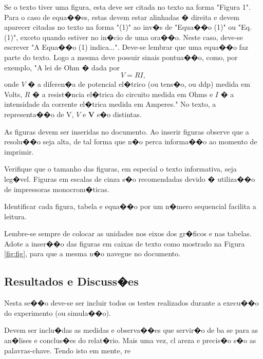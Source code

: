 \documentclass[conference]{IEEEtran}
\begin{document}
Se o texto tiver uma figura, esta deve ser citada no texto na forma "Figura 1". Para o caso de equa��es, estas devem estar alinhadas � direita e devem aparecer citadas no texto na forma "(1)" ao inv�s de "Equa��o (1)" ou "Eq. (1)", exceto quando estiver no in�cio de uma ora��o. Neste caso, deve-se escrever "A Equa��o (1) indica...".
Deve-se lembrar que uma equa��o faz parte do texto. Logo a mesma deve possuir sinais pontua��o, como, por exemplo, "A lei de Ohm � dada por
\begin{equation}
V = RI,
\end{equation}
onde $V$ � a diferen�a de potencial el�trico (ou tens�o, ou ddp) medida em Volts, $R$ � a resist�ncia el�trica do circuito medida em Ohms e $I$ � a intensidade da corrente el�trica medida em Amperes." No texto, a representa��o de V, $V$ e \textbf{V} s�o distintas.

As figuras devem ser inseridas no documento. Ao inserir figuras observe que a resolu��o seja alta, de tal forma que n�o perca informa��o ao momento de imprimir.

Verifique que o tamanho das figuras, em especial o texto informativa, seja leg�vel. Figuras em escalas de cinza s�o recomendadas devido � utiliza��o de impressoras monocrom�ticas.

Identificar cada figura, tabela e equa��o por um n�mero sequencial facilita a leitura.

Lembre-se sempre de colocar as unidades nos eixos dos gr�ficos e nas tabelas. Adote a inser��o das figuras em caixas de texto como mostrado na Figura \ref{fig:fig}, para que a mesma n�o navegue no documento.


\subsection{Resultados e Discuss�es}
Nesta se��o deve-se ser incluir todos os testes realizados durante a execu��o do experimento (ou simula��o).

Devem ser inclu�das as medidas e observa��es que servir�o de ba
se para as an�lises e conclus�es do relat�rio. Mais uma vez, cl
areza e precis�o s�o as palavras-chave. Tendo isto em mente, re
\end{document}
